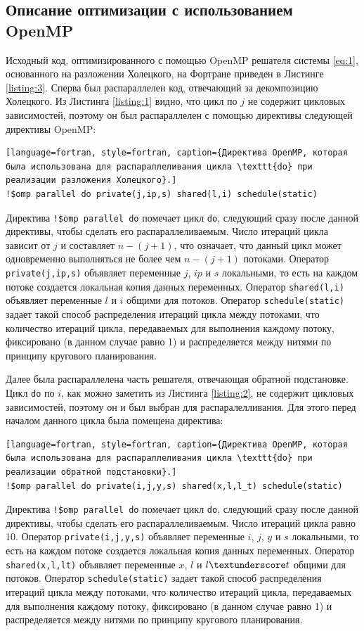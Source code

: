 \documentclass[12pt]{article}
\begin{document}
\subsection{Описание оптимизации с использованием OpenMP}

Исходный код, оптимизированного с помощью OpenMP решателя системы \eqref{eq:1}, основанного на разложении Холецкого, на Фортране приведен в Листинге \ref{listing:3}. Сперва был распараллелен код, отвечающий за декомпозицию Холецкого. Из Листинга \ref{listing:1} видно, что цикл по $j$ не содержит цикловых зависимостей, поэтому он был распараллелен с помощью директивы следующей директивы OpenMP:
\begin{lstlisting}[language=fortran, style=fortran, caption={Директива OpenMP, которая была использована для распараллеливания цикла \texttt{do} при реализации разложения Холецкого}.]
!$omp parallel do private(j,ip,s) shared(l,i) schedule(static)
\end{lstlisting}
Директива \texttt{!\$omp parallel do} помечает цикл \texttt{do}, следующий сразу после данной директивы, чтобы сделать его распараллеливаемым. Число итераций цикла зависит от $j$ и составляет $n-(j+1)$, что означает, что данный цикл может одновременно выполняться не более чем $n-(j+1)$ потоками. Оператор \texttt{private(j,ip,s)} объявляет переменные $j$, $ip$ и $s$ локальными, то есть на каждом потоке создается локальная копия данных переменных. Оператор \texttt{shared(l,i)} объявляет переменные $l$ и $i$ общими для потоков. Оператор \texttt{schedule(static)} задает такой способ распределения итераций цикла между потоками, что количество итераций цикла, передаваемых для выполнения каждому потоку, фиксировано (в данном случае равно 1) и распределяется между нитями по принципу кругового планирования.

Далее была распараллелена часть решателя, отвечающая обратной подстановке. Цикл \texttt{do} по $i$, как можно заметить из Листинга \ref{listing:2}, не содержит цикловых зависимостей, поэтому он и был выбран для распаралелливания. Для этого перед началом данного цикла была помещена директива: 
\begin{lstlisting}[language=fortran, style=fortran, caption={Директива OpenMP, которая была использована для распараллеливания цикла \texttt{do} при реализации обратной подстановки}.]
!$omp parallel do private(i,j,y,s) shared(x,l,l_t) schedule(static)
\end{lstlisting}
Директива \texttt{!\$omp parallel do} помечает цикл \texttt{do}, следующий сразу после данной директивы, чтобы сделать его распараллеливаемым. Число итераций цикла равно 10. Оператор \texttt{private(i,j,y,s)} объявляет переменные $i$, $j$, $y$ и $s$ локальными, то есть на каждом потоке создается локальная копия данных переменных. Оператор \texttt{shared(x,l,l\textunderscore t)} объявляет переменные $x$, $l$ и $l\textunderscore t$ общими для потоков. Оператор \texttt{schedule(static)} задает такой способ распределения итераций цикла между потоками, что количество итераций цикла, передаваемых для выполнения каждому потоку, фиксировано (в данном случае равно 1) и распределяется между нитями по принципу кругового планирования.
\end{document}
